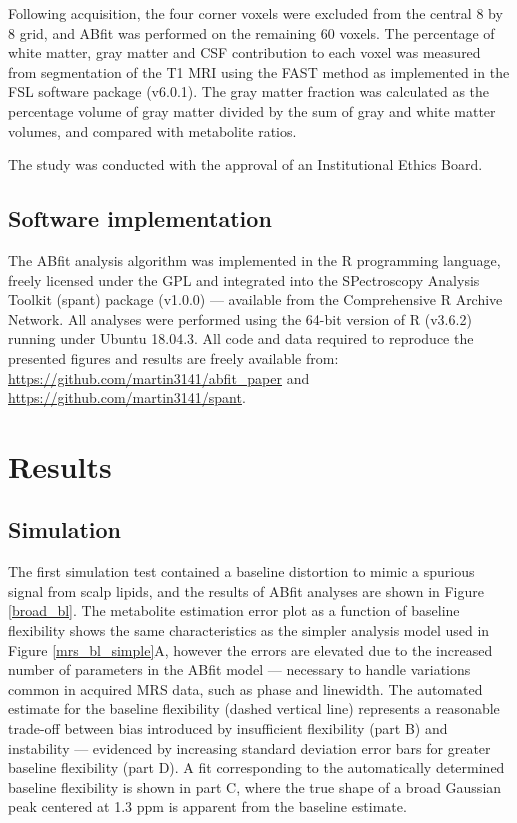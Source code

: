 \documentclass[num-refs]{wiley-article}
\begin{document}
Following acquisition, the four corner voxels were excluded from the central 8 by 8 grid, and ABfit was performed on the remaining 60 voxels. The percentage of white matter, gray matter and CSF contribution to each voxel was measured from segmentation of the T1 MRI using the FAST method \cite{Zhang2001} as implemented in the FSL software package (v6.0.1). The gray matter fraction was calculated as the percentage volume of gray matter divided by the sum of gray and white matter volumes, and compared with metabolite ratios.

The study was conducted with the approval of an Institutional Ethics Board.

\subsection{Software implementation}
The ABfit analysis algorithm was implemented in the R \cite{R2019} programming language, freely licensed under the GPL and integrated into the SPectroscopy Analysis Toolkit (spant) package (v1.0.0) --- available from the Comprehensive R Archive Network. All analyses were performed using the 64-bit version of R (v3.6.2) running under Ubuntu 18.04.3. All code and data required to reproduce the presented figures and results are freely available from: \url{https://github.com/martin3141/abfit_paper} and
\url{https://github.com/martin3141/spant}.

\section{Results}
\subsection{Simulation}
The first simulation test contained a baseline distortion to mimic a spurious signal from scalp lipids, and the results of ABfit analyses are shown in Figure \ref{broad_bl}. The metabolite estimation error plot as a function of baseline flexibility shows the same characteristics as the simpler analysis model used in Figure \ref{mrs_bl_simple}A, however the errors are elevated due to the increased number of parameters in the ABfit model --- necessary to handle variations common in acquired MRS data, such as phase and linewidth. The automated estimate for the baseline flexibility (dashed vertical line) represents a reasonable trade-off between bias introduced by insufficient flexibility (part B) and instability --- evidenced by increasing standard deviation error bars for greater baseline flexibility (part D). A fit corresponding to the automatically determined baseline flexibility is shown in part C, where the true shape of a broad Gaussian peak centered at 1.3 ppm is apparent from the baseline estimate.
\end{document}
